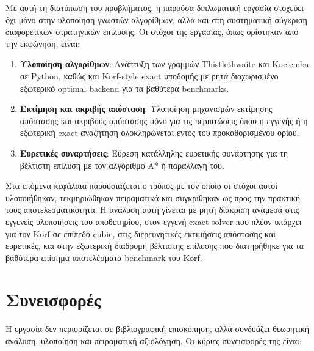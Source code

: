 Με αυτή τη διατύπωση του προβλήματος, η παρούσα διπλωματική εργασία στοχεύει όχι μόνο στην υλοποίηση γνωστών αλγορίθμων, αλλά και στη συστηματική σύγκριση διαφορετικών στρατηγικών επίλυσης. Οι στόχοι της εργασίας, όπως ορίστηκαν από την εκφώνηση, είναι:

\begin{enumerate}
    \item \textbf{Υλοποίηση αλγορίθμων}: Ανάπτυξη των γραμμών Thistlethwaite και Kociemba σε Python, καθώς και Korf-style exact υποδομής με ρητά διαχωρισμένο εξωτερικό optimal backend για τα βαθύτερα benchmarks.

    \item \textbf{Εκτίμηση και ακριβής απόσταση}: Υλοποίηση μηχανισμών εκτίμησης απόστασης και ακριβούς απόστασης μόνο για τις περιπτώσεις όπου η εγγενής ή η εξωτερική exact αναζήτηση ολοκληρώνεται εντός του προκαθορισμένου ορίου.

    \item \textbf{Ευρετικές συναρτήσεις}: Εύρεση κατάλληλης ευρετικής συνάρτησης για τη βέλτιστη επίλυση με τον αλγόριθμο A* ή παραλλαγή του.
\end{enumerate}

Στα επόμενα κεφάλαια παρουσιάζεται ο τρόπος με τον οποίο οι στόχοι αυτοί υλοποιήθηκαν, τεκμηριώθηκαν πειραματικά και συγκρίθηκαν ως προς την πρακτική τους αποτελεσματικότητα.
Η ανάλυση αυτή γίνεται με ρητή διάκριση ανάμεσα στις εγγενείς υλοποιήσεις του
αποθετηρίου, στον εγγενή exact solver που πλέον υπάρχει για τον Korf σε
επίπεδο cubie, στις διερευνητικές εκτιμήσεις απόστασης και ευρετικές, και
στην εξωτερική διαδρομή βέλτιστης επίλυσης που διατηρήθηκε για τα βαθύτερα
επίσημα αποτελέσματα benchmark του Korf.


\section{Συνεισφορές}
\label{sec:intro_contributions}

Η εργασία δεν περιορίζεται σε βιβλιογραφική επισκόπηση, αλλά συνδυάζει θεωρητική ανάλυση, υλοποίηση και πειραματική αξιολόγηση. Οι κύριες συνεισφορές της είναι:


